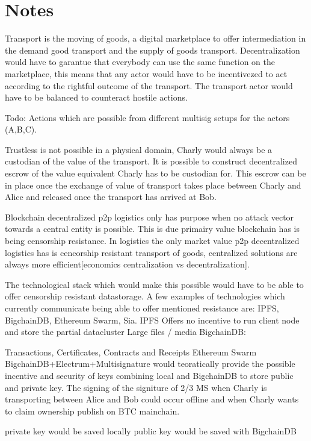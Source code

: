 \documentclass[11pt]{article}
\begin{document}
\section{Notes}

Transport is the moving of goods, a digital marketplace to offer intermediation in the demand good transport and the supply of goods transport. Decentralization would have to garantue that everybody can use the same function on the marketplace, this means that any actor would have to be incentivezed to act according to the rightful outcome of the transport. The transport actor would have to be balanced to counteract hostile actions.

Todo: Actions which are possible from different multisig setups for the actors (A,B,C).

Trustless is not possible in a physical domain, Charly would always be a custodian of the value of the transport. It is possible to construct decentralized escrow of the value equivalent Charly has to be custodian for. This escrow can be in place once the exchange of value of transport takes place between Charly and Alice and released once the transport has arrived at Bob.

Blockchain decentralized p2p logistics only has purpose when no attack vector towards a central entity is possible. This is due primairy value blockchain has is being censorship resistance. In logistics the only market value p2p decentralized logistics has is cencorship resistant transport of goods, centralized solutions are always more efficient[economics centralization vs decentralization].

The technological stack which would make this possible would have to be able to offer censorship resistant datastorage. A few examples of technologies which currently communicate being able to offer mentioned resistance are: IPFS, BigchainDB, Ethereum Swarm, Sia.
IPFS
Offers no incentive to run client node and store the partial datacluster
Large files / media
BigchainDB:

Transactions, Certificates, Contracts and Receipts
Ethereum Swarm
BigchainDB+Electrum+Multisignature would teoratically provide the possible incentive and security of keys combining local and BigchainDB to store public and private key. The signing of the signiture of 2/3 MS when Charly is transporting between Alice and Bob could occur offline and when Charly wants to claim ownership publish on BTC mainchain.

private key would be saved locally
public key would be saved with BigchainDB
\end{document}
